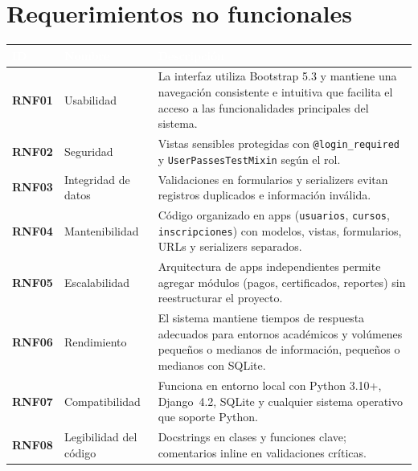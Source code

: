 \documentclass[11pt,letterpaper]{article}
\newcommand{\headrowcolor}{\rowcolor{azulUAZ}}
\newcommand{\headcell}[1]{\textcolor{white}{\textbf{#1}}}
\begin{document}
	\section{Requerimientos no funcionales}
	\begin{center}\small
		\begin{tabularx}{\linewidth}{|>{\bfseries}p{1.3cm}|p{3.2cm}|X|}
			\hline
			\headrowcolor \headcell{ID} & \headcell{Nombre} & \headcell{Descripci\'on} \\ \hline
			RNF01 & Usabilidad & La interfaz utiliza Bootstrap 5.3 y mantiene una navegaci\'on consistente e intuitiva que facilita el acceso a las funcionalidades principales del sistema. \\ \hline
			\rowcolor{grisAlt}
			RNF02 & Seguridad & Vistas sensibles protegidas con \texttt{@login\_required} y \texttt{UserPassesTestMixin} seg\'un el rol. \\ \hline
			RNF03 & Integridad de datos & Validaciones en formularios y serializers evitan registros duplicados e informaci\'on inv\'alida. \\ \hline
			\rowcolor{grisAlt}
			RNF04 & Mantenibilidad & C\'odigo organizado en apps (\texttt{usuarios}, \texttt{cursos}, \texttt{inscripciones}) con modelos, vistas, formularios, URLs y serializers separados. \\ \hline
			RNF05 & Escalabilidad & Arquitectura de apps independientes permite agregar m\'odulos (pagos, certificados, reportes) sin reestructurar el proyecto. \\ \hline
			\rowcolor{grisAlt}
			RNF06 & Rendimiento & El sistema mantiene tiempos de respuesta adecuados para entornos acad\'emicos y vol\'umenes peque\~nos o medianos de informaci\'on, peque\~nos o medianos con SQLite. \\ \hline
			RNF07 & Compatibilidad & Funciona en entorno local con Python 3.10+, Django~4.2, SQLite y cualquier sistema operativo que soporte Python. \\ \hline
			\rowcolor{grisAlt}
			RNF08 & Legibilidad del c\'odigo & Docstrings en clases y funciones clave; comentarios inline en validaciones cr\'iticas. \\ \hline
		\end{tabularx}
	\end{center}
	
\end{document}
